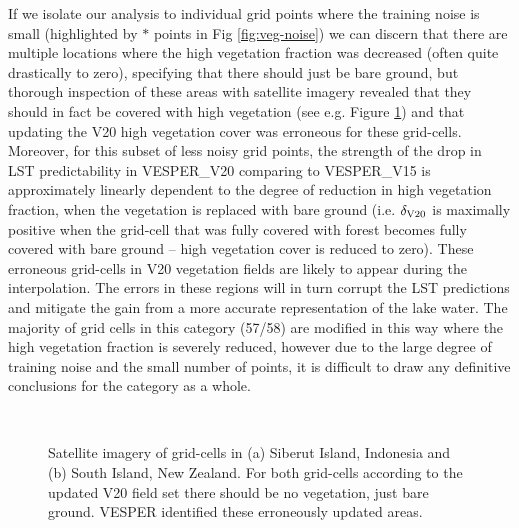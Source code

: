 \documentclass[hess, twostagejnl]{copernicus}
\begin{document}
If we isolate our analysis to individual grid points where the training noise is small (highlighted by $*$ points in Fig \ref{fig:veg-noise}) we can discern that there are multiple locations where the high vegetation fraction was decreased (often quite drastically to zero), specifying that there should just be bare ground, but thorough inspection of these areas with satellite imagery revealed that they should in fact be covered with high vegetation (see e.g. Figure \ref{fig:cvh}) and that updating the V20 high vegetation cover was erroneous for these grid-cells. Moreover, for this subset of less noisy grid points, the strength of the drop in LST predictability in VESPER\_V20 comparing to VESPER\_V15 is approximately linearly dependent to the degree of reduction in high vegetation fraction, when the vegetation is replaced with bare ground (i.e. $\delta_{\rm V20}$ is maximally positive when the grid-cell that was fully covered with forest becomes fully covered with bare ground – high vegetation cover is reduced to zero). These erroneous grid-cells in V20 vegetation fields are likely to appear during the interpolation. The errors in these regions will in turn corrupt the LST predictions and mitigate the gain from a more accurate representation of the lake water. The majority of grid cells in this category (57/58) are modified in this way where the high vegetation fraction is severely reduced, however due to the large degree of training noise and the small number of points, it is difficult to draw any definitive conclusions for the category as a whole.
	\begin{figure}[h!]
	 \\
	\caption{Satellite imagery of grid-cells in (a) Siberut Island, Indonesia and (b) South Island, New Zealand. For both grid-cells according to the updated V20 field set there should be no vegetation, just bare ground. VESPER identified these erroneously updated areas.} 
	\label{fig:cvh}
\end{figure}
\end{document}
